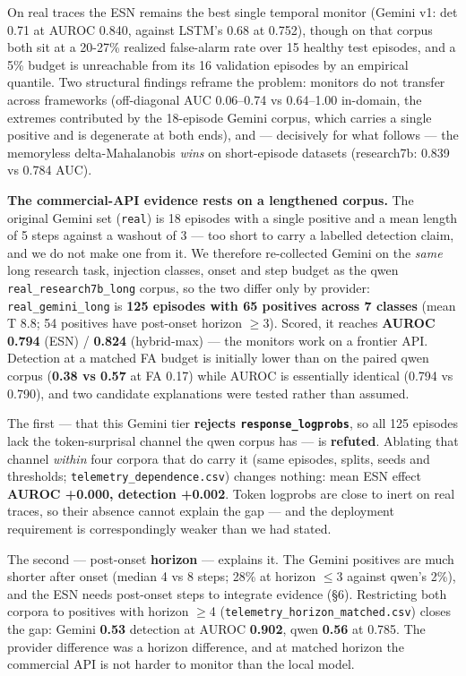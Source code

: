 \documentclass[11pt]{article}
\begin{document}
On real traces the ESN remains the best single temporal monitor (Gemini v1: det 0.71 at AUROC 0.840, against LSTM's 0.68 at 0.752), though on that corpus both sit at a 20-27\% realized false-alarm rate over 15 healthy test episodes, and a 5\% budget is unreachable from its 16 validation episodes by an empirical quantile. Two structural findings reframe the problem: monitors do not transfer across frameworks (off-diagonal AUC 0.06--0.74 vs 0.64--1.00 in-domain, the extremes contributed by the 18-episode Gemini corpus, which carries a single positive and is degenerate at both ends), and --- decisively for what follows --- the memoryless delta-Mahalanobis \emph{wins} on short-episode datasets (research7b: 0.839 vs 0.784 AUC).


\textbf{The commercial-API evidence rests on a lengthened corpus.} The original Gemini set (\texttt{real}) is 18 episodes with a single positive and a mean length of 5 steps against a washout of 3 --- too short to carry a labelled detection claim, and we do not make one from it. We therefore re-collected Gemini on the \emph{same} long research task, injection classes, onset and step budget as the qwen \texttt{real\_\allowbreak{}research7b\_\allowbreak{}long} corpus, so the two differ only by provider: \texttt{real\_\allowbreak{}gemini\_\allowbreak{}long} is \textbf{125 episodes with 65 positives across 7 classes} (mean T 8.8; 54 positives have post-onset horizon $\geq$3). Scored, it reaches \textbf{AUROC 0.794} (ESN) / \textbf{0.824} (hybrid-max) --- the monitors work on a frontier API. Detection at a matched FA budget is initially lower than on the paired qwen corpus (\textbf{0.38 vs 0.57} at FA 0.17) while AUROC is essentially identical (0.794 vs 0.790), and two candidate explanations were tested rather than assumed.


The first --- that this Gemini tier \textbf{rejects \texttt{response\_\allowbreak{}logprobs}}, so all 125 episodes lack the token-surprisal channel the qwen corpus has --- is \textbf{refuted}. Ablating that channel \emph{within} four corpora that do carry it (same episodes, splits, seeds and thresholds; \texttt{telemetry\_\allowbreak{}dependence.csv}) changes nothing: mean ESN effect \textbf{AUROC +0.000, detection +0.002}. Token logprobs are close to inert on real traces, so their absence cannot explain the gap --- and the deployment requirement is correspondingly weaker than we had stated.


The second --- post-onset \textbf{horizon} --- explains it. The Gemini positives are much shorter after onset (median 4 vs 8 steps; 28\% at horizon $\leq$3 against qwen's 2\%), and the ESN needs post-onset steps to integrate evidence (\S{}6). Restricting both corpora to positives with horizon $\geq$4 (\texttt{telemetry\_\allowbreak{}horizon\_\allowbreak{}matched.csv}) closes the gap: Gemini \textbf{0.53} detection at AUROC \textbf{0.902}, qwen \textbf{0.56} at 0.785. The provider difference was a horizon difference, and at matched horizon the commercial API is not harder to monitor than the local model.
\end{document}
